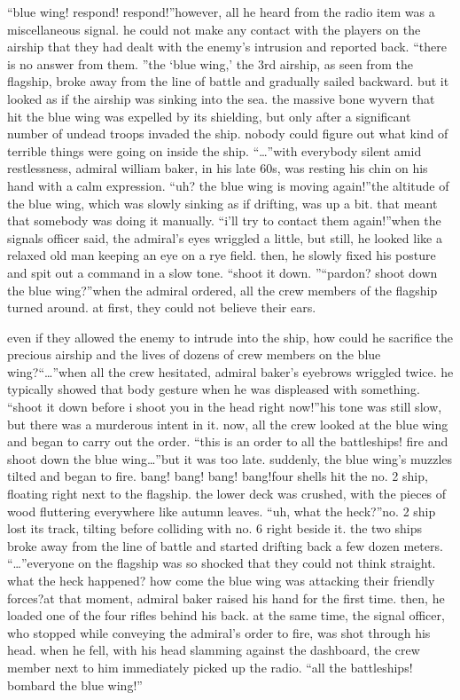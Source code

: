 “blue wing! respond! respond!”however, all he heard from the radio item was a miscellaneous signal.
 he could not make any contact with the players on the airship that they had dealt with the enemy’s intrusion and reported back.
“there is no answer from them.
”the ‘blue wing,’ the 3rd airship, as seen from the flagship, broke away from the line of battle and gradually sailed backward.
 but it looked as if the airship was sinking into the sea.
the massive bone wyvern that hit the blue wing was expelled by its shielding, but only after a significant number of undead troops invaded the ship.
nobody could figure out what kind of terrible things were going on inside the ship.
“…”with everybody silent amid restlessness, admiral william baker, in his late 60s, was resting his chin on his hand with a calm expression.
“uh? the blue wing is moving again!”the altitude of the blue wing, which was slowly sinking as if drifting, was up a bit.
 that meant that somebody was doing it manually.
“i’ll try to contact them again!”when the signals officer said, the admiral’s eyes wriggled a little, but still, he looked like a relaxed old man keeping an eye on a rye field.
then, he slowly fixed his posture and spit out a command in a slow tone.
“shoot it down.
”“pardon? shoot down the blue wing?”when the admiral ordered, all the crew members of the flagship turned around.
at first, they could not believe their ears.


even if they allowed the enemy to intrude into the ship, how could he sacrifice the precious airship and the lives of dozens of crew members on the blue wing?“…”when all the crew hesitated, admiral baker’s eyebrows wriggled twice.
he typically showed that body gesture when he was displeased with something.
“shoot it down before i shoot you in the head right now!”his tone was still slow, but there was a murderous intent in it.
now, all the crew looked at the blue wing and began to carry out the order.
“this is an order to all the battleships! fire and shoot down the blue wing…”but it was too late.
 suddenly, the blue wing’s muzzles tilted and began to fire.
bang! bang! bang! bang!four shells hit the no.
 2 ship, floating right next to the flagship.
 the lower deck was crushed, with the pieces of wood fluttering everywhere like autumn leaves.
“uh, what the heck?”no.
 2 ship lost its track, tilting before colliding with no.
 6 right beside it.
the two ships broke away from the line of battle and started drifting back a few dozen meters.
“…”everyone on the flagship was so shocked that they could not think straight.
 what the heck happened? how come the blue wing was attacking their friendly forces?at that moment, admiral baker raised his hand for the first time.
 then, he loaded one of the four rifles behind his back.
 at the same time, the signal officer, who stopped while conveying the admiral’s order to fire, was shot through his head.
 when he fell, with his head slamming against the dashboard, the crew member next to him immediately picked up the radio.
“all the battleships! bombard the blue wing!”

 